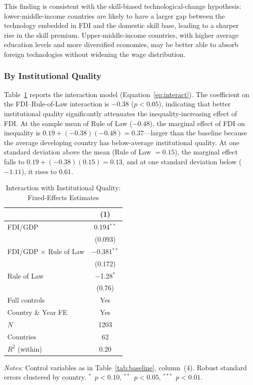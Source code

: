 \documentclass[12pt,a4paper]{article}
\begin{document}
This finding is consistent with the skill-biased technological-change hypothesis: lower-middle-income countries are likely to have a larger gap between the technology embedded in FDI and the domestic skill base, leading to a sharper rise in the skill premium.  Upper-middle-income countries, with higher average education levels and more diversified economies, may be better able to absorb foreign technologies without widening the wage distribution.

\subsubsection{By Institutional Quality}

Table~\ref{tab:hetero_inst} reports the interaction model (Equation~\ref{eq:interact}).  The coefficient on the FDI--Rule-of-Law interaction is $-$0.38 ($p < 0.05$), indicating that better institutional quality significantly attenuates the inequality-increasing effect of FDI.  At the sample mean of Rule of Law ($-0.48$), the marginal effect of FDI on inequality is $0.19 + (-0.38)(-0.48) = 0.37$---larger than the baseline because the average developing country has below-average institutional quality.  At one standard deviation above the mean (Rule of Law $= 0.15$), the marginal effect falls to $0.19 + (-0.38)(0.15) = 0.13$, and at one standard deviation below ($-1.11$), it rises to $0.61$.

\begin{table}[H]
\centering
\caption{Interaction with Institutional Quality: Fixed-Effects Estimates}
\label{tab:hetero_inst}
\begin{threeparttable}
\begin{tabular}{@{} l c @{}}
\toprule
 & (1) \\
\midrule
FDI/GDP                     & 0.194$^{**}$  \\
                            & (0.093)       \\[4pt]
FDI/GDP $\times$ Rule of Law & $-$0.381$^{**}$ \\
                            & (0.172)       \\[4pt]
Rule of Law                 & $-$1.28$^{*}$ \\
                            & (0.76)        \\[4pt]
\midrule
Full controls               & Yes \\
Country \& Year FE          & Yes \\
$N$                         & 1203 \\
Countries                   & 62   \\
$R^{2}$ (within)            & 0.20 \\
\bottomrule
\end{tabular}
\begin{tablenotes}[flushleft]\footnotesize
\item \textit{Notes:} Control variables as in Table~\ref{tab:baseline}, column~(4).  Robust standard errors clustered by country.  $^{*}$~$p<0.10$, $^{**}$~$p<0.05$, $^{***}$~$p<0.01$.
\end{tablenotes}
\end{threeparttable}
\end{table}
\end{document}
